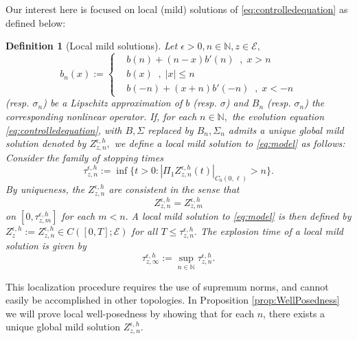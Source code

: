\documentclass[10pt, reqno]{amsart}
\newcommand{\N}{\mathbb{N}}
\newcommand{\e}{\mathcal{E}}
\newtheorem{dfn}{Definition}
\theoremstyle{definition}
\numberwithin{lem}{section}
\numberwithin{cor}{section}
\numberwithin{prop}{section}
\numberwithin{thm}{section}
\numberwithin{dfn}{section}
\begin{document}
 Our interest here is focused on local (mild) solutions of \eqref{eq:controlledequation} as defined below:

 \begin{dfn}[Local mild solutions]\label{dfn:local mild solutions}   Let $\epsilon>0, n\in\N, z\in\e,$ 
\begin{equation}\label{eq:bnlocalization}
 b_n(x):=
\begin{cases}
    &  b(n)+(n-x)b'(n)\;\;,\;x> n\\&
    b(x)\;\;,\;|x|\leq n\\&
    b(-n)+(x+n)b'(-n)\;\;,\;x<-n
\end{cases}
 \end{equation}
(resp. $\sigma_n$) be a Lipschitz approximation of $b$ (resp. $\sigma$) and $B_n$ (resp. $\sigma_n$) the corresponding nonlinear operator. If, for each $n\in\N,$ the evolution equation \eqref{eq:controlledequation}, with $B, \Sigma$
replaced by $B_n,\Sigma_n$ admits a unique global mild solution denoted by $Z^{\epsilon, h}_{z,n},$ we define a local mild solution to \eqref{eq:model} as follows:  Consider the family of stopping times
\begin{equation*}\label{eq:LocalizingStoppingTimes}
	\tau^{\epsilon, h}_{z,n}:=\inf\{t>0 : | \Pi_1Z^{\epsilon, h}_{z,n}(t)|_{C_0(0,\ell)}> n\}.
\end{equation*}
By uniqueness, the $Z^{\epsilon,h}_{z,n}$ are consistent in the sense that $$Z_{z,n}^{\epsilon, h}=Z_{z,m}^{\epsilon, h}$$ on $[0, \tau^{\epsilon, h}_{z,m}]$ for each $m<n.$     
A local mild solution to \eqref{eq:model} is then defined  by 
$Z_z^{\epsilon,h}:=Z_{z,n}^{\epsilon, h}\in C([0,T];\e)$ for all $T\leq \tau^{\epsilon, h}_{z,n}. $ The explosion time of a local mild solution is given by 
\begin{equation}\label{eq:explosiontime}   \tau^{\epsilon, h}_{z,\infty}:=\sup_{n\in\N}\tau^{\epsilon, h}_{z,n}.
\end{equation}
 \end{dfn}

This localization procedure requires the use of supremum norms, and cannot easily be accomplished in other topologies. In Proposition \ref{prop:WellPosedness} we will prove local well-posedness by showing that for each $n$, there exists a unique global mild solution $Z^{\epsilon,h}_{z,n}.$  




 
\end{document}
